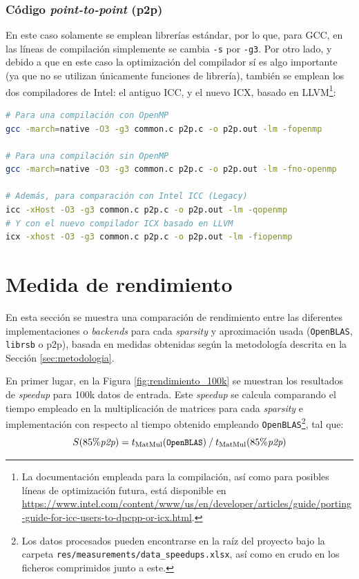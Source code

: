 \subsubsection{Código \textit{point-to-point} (p2p)}
En este caso solamente se emplean librerías estándar, por lo que, para GCC, en las líneas de compilación simplemente se cambia \texttt{-s} por \texttt{-g3}. Por otro lado, y debido a que en este caso la optimización del compilador sí es algo importante (ya que no se utilizan únicamente funciones de librería), también se emplean los dos compiladores de Intel: el antiguo ICC, y el nuevo ICX, basado en LLVM\footnote{La documentación empleada para la compilación, así como para posibles líneas de optimización futura, está disponible en \url{https://www.intel.com/content/www/us/en/developer/articles/guide/porting-guide-for-icc-users-to-dpcpp-or-icx.html}.}:\medskip
\begin{lstlisting}[language=bash]
# Para una compilación con OpenMP
gcc -march=native -O3 -g3 common.c p2p.c -o p2p.out -lm -fopenmp

# Para una compilación sin OpenMP
gcc -march=native -O3 -g3 common.c p2p.c -o p2p.out -lm -fno-openmp

# Además, para comparación con Intel ICC (Legacy)
icc -xHost -O3 -g3 common.c p2p.c -o p2p.out -lm -qopenmp
# Y con el nuevo compilador ICX basado en LLVM
icx -xhost -O3 -g3 common.c p2p.c -o p2p.out -lm -fiopenmp
\end{lstlisting}

\section{Medida de rendimiento}
\label{sec:medida_rendimiento}
En esta sección se muestra una comparación de rendimiento entre las diferentes implementaciones o \textit{\gls{backend}s} para cada \textit{sparsity} y aproximación usada (\texttt{OpenBLAS}, \texttt{librsb} o p2p), basada en medidas obtenidas según la metodología descrita en la Sección \ref{sec:metodologia}.

En primer lugar, en la Figura \ref{fig:rendimiento_100k} se muestran los resultados de \textit{speedup} para 100k datos de entrada. Este \textit{speedup} se calcula comparando el tiempo empleado en la multiplicación de matrices para cada \textit{sparsity} e implementación con respecto al tiempo obtenido empleando \texttt{OpenBLAS}\footnote{Los datos procesados pueden encontrarse en la raíz del proyecto bajo la carpeta \texttt{res/measurements/data\_speedups.xlsx}, así como en crudo en los ficheros comprimidos junto a este.}, tal que:
\begin{equation}
    S(85\%\textit{p2p}) = t_{\text{MatMul}}(\texttt{\small OpenBLAS})\: /\: t_{\text{MatMul}}(85\%\textit{p2p})\nonumber
    \label{eq:speedup_example}
\end{equation}

